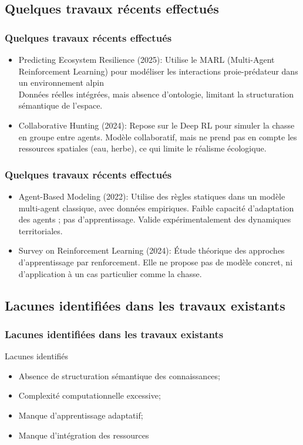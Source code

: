 \documentclass[11pt]{beamer}
\begin{document}
\subsection{Quelques travaux récents effectués}
\begin{frame}
    \frametitle{Quelques travaux récents effectués}
    \begin{itemize}
        \item Predicting Ecosystem Resilience (2025): Utilise le MARL (Multi-Agent Reinforcement Learning) pour modéliser les interactions proie-prédateur dans un environnement alpin\\
Données réelles intégrées, mais  absence d’ontologie, limitant la structuration sémantique de l’espace.

\item Collaborative Hunting (2024): Repose sur le Deep RL pour simuler la chasse en groupe entre agents.
Modèle collaboratif, mais  ne prend pas en compte les ressources spatiales (eau, herbe), ce qui limite le réalisme écologique.
\end{itemize}
\end{frame}
\begin{frame}
\frametitle{Quelques travaux récents effectués}
 \begin{itemize}
     \item Agent-Based Modeling (2022):
Utilise des règles statiques dans un modèle multi-agent classique, avec données empiriques.
Faible capacité d’adaptation des agents ; pas d’apprentissage.
Valide expérimentalement des dynamiques territoriales.
\item   Survey on Reinforcement Learning (2024):
 Étude théorique des approches d’apprentissage par renforcement.
 Elle ne propose pas de modèle concret, ni d’application à un cas particulier comme la chasse.

 \end{itemize}   
\end{frame}

\subsection{Lacunes identifiées dans les travaux existants}
\begin{frame}
\frametitle{ Lacunes identifiées dans les travaux existants}
\begin{block}{Lacunes identifiés}
\begin{itemize}
    \item Absence de structuration sémantique des connaissances;
    \item Complexité computationnelle excessive;
    \item Manque d’apprentissage adaptatif;
    \item Manque d’intégration des ressources 
\end{itemize}
\end{block}
\end{frame}
\end{document}

